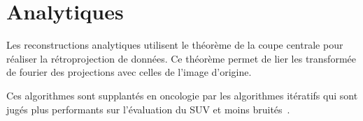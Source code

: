 	\section{Analytiques}

Les reconstructions analytiques utilisent le théorème de la coupe centrale pour réaliser la rétroprojection de données. Ce théorème permet de lier les transformée de fourier des projections avec celles de l'image d'origine. 
 
Ces algorithmes sont supplantés en oncologie par les algorithmes itératifs qui sont jugés plus performants sur l'évaluation du SUV et moins bruités~\cite{schoder2004clinical}.